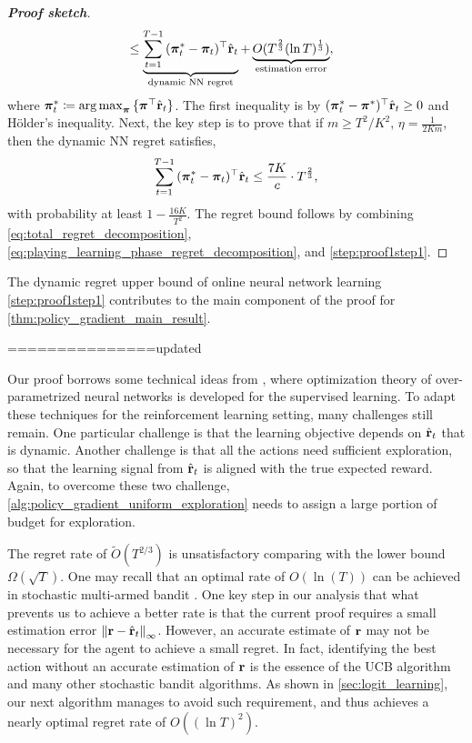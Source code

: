 \begin{proof}[\bf Proof sketch]
\begin{equation}
{\begin{split}
&\le \underbrace{ \sum\limits_{t=1}^{T-1}{ ( {{\boldsymbol{\pi}}_t^*} - {\boldsymbol{\pi}}_t )^\top \hat{{\mathbf{r}}}_t  } }_{\text{dynamic NN regret}} + \underbrace{ O(T^{\frac{2}{3}}( \ln{T} )^{\frac{1}{3}}) }_{\text{estimation error}},
\end{split}
}
\end{equation}
where ${\boldsymbol{\pi}}_t^* \coloneqq \operatorname*{arg\,max}_{{\boldsymbol{\pi}} }{\{ {\boldsymbol{\pi}}^\top \hat{{\mathbf{r}}}_t\}}$. The first inequality is by $( {\boldsymbol{\pi}}_t^* - {\boldsymbol{\pi}}^*)^\top \hat{{\mathbf{r}}}_t \ge 0$ and H{\" o}lder's inequality. Next, the key step is to prove that if $m \ge T^2 /K^2$, $\eta = \frac{1}{2 K m}$, then the dynamic NN regret satisfies,
\begin{equation}
\label{step:proof1step1}
\begin{split}
\sum\limits_{t=1}^{T-1}{ (  {{\boldsymbol{\pi}}_t^*} - {\boldsymbol{\pi}}_t )^\top \hat{{\mathbf{r}}}_t } \le \frac{7 K}{c} \cdot  T^{\frac{2}{3}},
\end{split}
\end{equation}
with probability at least $1 - \frac{16 K}{T^2}$.
The regret bound follows by combining \cref{eq:total_regret_decomposition}, \cref{eq:playing_learning_phase_regret_decomposition}, and \cref{step:proof1step1}.
\end{proof}
The dynamic regret upper bound of online neural network learning \cref{step:proof1step1} contributes to the main component of the proof for \cref{thm:policy_gradient_main_result}.

===============updated


	Our proof borrows some technical ideas from \cite{li2018learning,allen2018convergenceB},  where optimization theory of over-parametrized neural networks is developed for the supervised learning. To adapt these techniques for the reinforcement learning setting, many challenges still remain. One particular challenge is that the learning objective depends on $\hat{{\mathbf{r}}}_t$ that is dynamic. Another challenge is that all the actions need sufficient exploration, so that the learning signal from $\hat{{\mathbf{r}}}_t$ is aligned with the true expected reward. Again, to overcome these two challenge, \cref{alg:policy_gradient_uniform_exploration} needs to assign a large portion of budget for exploration.

\begin{remk}
The regret rate of $\tilde{O}(T^{2/3})$ is unsatisfactory comparing with the lower bound $\Omega(\sqrt{T})$. 
One may recall that an optimal rate of $O(\ln(T))$ can be achieved in stochastic multi-armed bandit \citep{bubeck2012regret}. 
One key step in our analysis that what prevents us to achieve a better rate is that the current proof requires a small estimation error $\left\| {\mathbf{r}} - \hat{{\mathbf{r}}}_t \right\|_\infty$.
However, an accurate estimate of ${\mathbf{r}}$ may not be necessary for the agent to achieve a small regret. 
In fact, identifying the best action without an accurate estimation of ${\mathbf{r}}$ is the essence of the UCB algorithm and many other stochastic bandit algorithms. 
As shown in \cref{sec:logit_learning}, our next algorithm manages to avoid such requirement, and thus achieves a nearly optimal regret rate of $O((\ln T)^2)$.
\end{remk}


